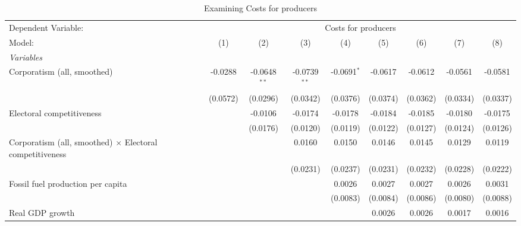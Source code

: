 
\begin{table}[htbp]
   \caption{Examining Costs for producers}
   \centering
   \begin{tabular}{lcccccccc}
      \tabularnewline \midrule \midrule
      Dependent Variable: & \multicolumn{8}{c}{Costs for producers}\\
      Model:                                                          & (1)      & (2)            & (3)            & (4)           & (5)      & (6)      & (7)                    & (8)\\  
      \midrule
      \emph{Variables}\\
      Corporatism (all, smoothed)                                     & -0.0288  & -0.0648$^{**}$ & -0.0739$^{**}$ & -0.0691$^{*}$ & -0.0617  & -0.0612  & -0.0561                & -0.0581\\   
                                                                      & (0.0572) & (0.0296)       & (0.0342)       & (0.0376)      & (0.0374) & (0.0362) & (0.0334)               & (0.0337)\\   
      Electoral competitiveness                                       &          & -0.0106        & -0.0174        & -0.0178       & -0.0184  & -0.0185  & -0.0180                & -0.0175\\   
                                                                      &          & (0.0176)       & (0.0120)       & (0.0119)      & (0.0122) & (0.0127) & (0.0124)               & (0.0126)\\   
      Corporatism (all, smoothed) $\times$ Electoral competitiveness  &          &                & 0.0160         & 0.0150        & 0.0146   & 0.0145   & 0.0129                 & 0.0119\\   
                                                                      &          &                & (0.0231)       & (0.0237)      & (0.0231) & (0.0232) & (0.0228)               & (0.0222)\\   
      Fossil fuel production per capita                               &          &                &                & 0.0026        & 0.0027   & 0.0027   & 0.0026                 & 0.0031\\   
                                                                      &          &                &                & (0.0083)      & (0.0084) & (0.0086) & (0.0080)               & (0.0088)\\   
      Real GDP growth                                                 &          &                &                &               & 0.0026   & 0.0026   & 0.0017                 & 0.0016\\   

\end{tabular}
\end{table}
